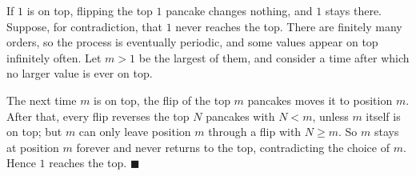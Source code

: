 If $1$ is on top, flipping the top $1$ pancake changes nothing, and $1$ stays there. Suppose, for contradiction, that $1$ never reaches the top. There are finitely many orders, so the process is eventually periodic, and some values appear on top infinitely often. Let $m>1$ be the largest of them, and consider a time after which no larger value is ever on top.

The next time $m$ is on top, the flip of the top $m$ pancakes moves it to position $m$. After that, every flip reverses the top $N$ pancakes with $N<m$, unless $m$ itself is on top; but $m$ can only leave position $m$ through a flip with $N\ge m$. So $m$ stays at position $m$ forever and never returns to the top, contradicting the choice of $m$. Hence $1$ reaches the top. $\blacksquare$
